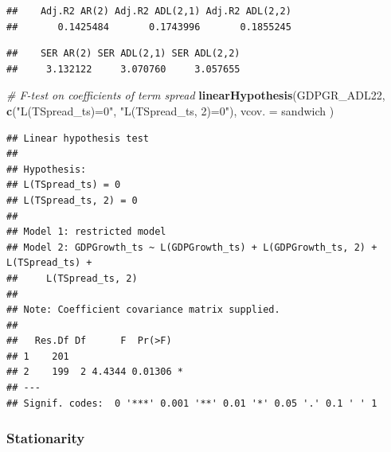 \documentclass[]{book}
\newenvironment{Shaded}{\begin{snugshade}}{\end{snugshade}}
\newcommand{\KeywordTok}[1]{\textcolor[rgb]{0.13,0.29,0.53}{\textbf{#1}}}
\newcommand{\DataTypeTok}[1]{\textcolor[rgb]{0.13,0.29,0.53}{#1}}
\newcommand{\StringTok}[1]{\textcolor[rgb]{0.31,0.60,0.02}{#1}}
\newcommand{\CommentTok}[1]{\textcolor[rgb]{0.56,0.35,0.01}{\textit{#1}}}
\newcommand{\OperatorTok}[1]{\textcolor[rgb]{0.81,0.36,0.00}{\textbf{#1}}}
\newcommand{\NormalTok}[1]{#1}
\theoremstyle{definition}
\theoremstyle{definition}
\theoremstyle{definition}
\theoremstyle{remark}
\begin{document}
\begin{verbatim}
##    Adj.R2 AR(2) Adj.R2 ADL(2,1) Adj.R2 ADL(2,2) 
##       0.1425484       0.1743996       0.1855245
\end{verbatim}

\begin{Shaded}
\end{Shaded}

\begin{verbatim}
##    SER AR(2) SER ADL(2,1) SER ADL(2,2) 
##     3.132122     3.070760     3.057655
\end{verbatim}

\begin{Shaded}
\begin{Highlighting}[]
\CommentTok{# F-test on coefficients of term spread}
\KeywordTok{linearHypothesis}\NormalTok{(GDPGR_ADL22, }
                 \KeywordTok{c}\NormalTok{(}\StringTok{"L(TSpread_ts)=0"}\NormalTok{, }\StringTok{"L(TSpread_ts, 2)=0"}\NormalTok{),}
                 \DataTypeTok{vcov. =}\NormalTok{ sandwich}
\NormalTok{                 )}
\end{Highlighting}
\end{Shaded}

\begin{verbatim}
## Linear hypothesis test
## 
## Hypothesis:
## L(TSpread_ts) = 0
## L(TSpread_ts, 2) = 0
## 
## Model 1: restricted model
## Model 2: GDPGrowth_ts ~ L(GDPGrowth_ts) + L(GDPGrowth_ts, 2) + L(TSpread_ts) + 
##     L(TSpread_ts, 2)
## 
## Note: Coefficient covariance matrix supplied.
## 
##   Res.Df Df      F  Pr(>F)  
## 1    201                    
## 2    199  2 4.4344 0.01306 *
## ---
## Signif. codes:  0 '***' 0.001 '**' 0.01 '*' 0.05 '.' 0.1 ' ' 1
\end{verbatim}

\subsubsection*{Stationarity}\label{stationarity}
\end{document}
